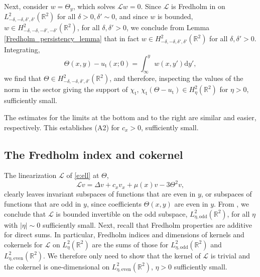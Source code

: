 \documentclass[10pt]{article}
\newcommand{\R}{\mathbb{R}}
\newcommand{\rmd}{\mathrm{d}}
\begin{document}
Next, consider $w=\Theta_y$, which solves $\mathscr{L}w=0$. Since $\mathscr{L}$ is Fredholm in on $L^2_{-\delta,-\delta,\delta',\delta'}(\R^2)$ for all $\delta>0,\delta'\sim 0$, and since $w$ is bounded,  $w\in  H^2_{-\delta,-\delta,-\delta',-\delta'}(\R^2)$, for all $\delta,\delta'>0$, we conclude from Lemma \ref{Fredholm_persistency_lemma} that in fact $w\in  H^2_{-\delta,-\delta,\delta',\delta'}(\R^2)$ for all $\delta,\delta'>0$. Integrating, 
\[
\Theta(x,y)-u_\mathrm{t}(x;0)=\int_{\infty}^y w(x,y')\rmd y',
\]
we find that $\Theta\in H^2_{-\delta,-\delta,\delta',\delta'}(\R^2)$, and therefore, inspecting the values of the norm in the sector giving the support of $\chi_\mathrm{t}$, $\chi_\mathrm{t}(\Theta-u_\mathrm{t})\in H^2_\eta(\R^2)$ for $\eta>0$, sufficiently small. 

The estimates for the limits at the bottom and to the right are similar and easier, respectively. This establishes (A2) for $c_x>0$, sufficiently small. 




\subsection{The Fredholm index and cokernel}\label{s:3.3}

The linearization $\mathscr{L}$ of \eqref{e:ell} at $\Theta$, 
\[
\mathscr{L}v =\Delta v + c_xv_x   + \mu(x) v - 3\Theta^2v,
\]
clearly leaves invariant subspaces of functions that are even in $y$, or subspaces of functions that are odd in $y$, since coefficients $\Theta(x,y)$ are even in $y$. From \cite[Lem. 4.6]{Monteiro_Scheel}, we conclude that $\mathscr{L}$ is bounded invertible on the odd subspace, $L^2_{\eta,\mathrm{odd}}(\R^2)$, for all $\eta$ with $|\eta|\sim0$ sufficiently small. Next, recall that Fredholm properties are additive for direct sums. In particular, Fredholm indices and dimensions of kernels and cokernels for $\mathscr{L}$ on $L^2_{\eta}(\R^2)$ are the sums of those for $L^2_{\eta,\mathrm{odd}}(\R^2)$ and $L^2_{\eta,\mathrm{even}}(\R^2)$. We therefore only need to show that the kernel of $\mathscr{L}$ is trivial and the cokernel is one-dimensional on $L^2_{\eta,\mathrm{even}}(\R^2)$, $\eta>0$ sufficiently small. 
\end{document}
